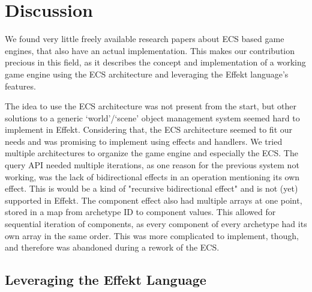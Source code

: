 \chapter{Discussion}\label{chap:discussion}

We found very little freely available research papers about ECS based game engines, that also have an actual implementation. This makes our contribution precious in this field, as it describes the concept and implementation of a working game engine using the ECS architecture and leveraging the Effekt language's features.

The idea to use the ECS architecture was not present from the start, but other solutions to a generic `world'/`scene' object management system seemed hard to implement in Effekt. Considering that, the ECS architecture seemed to fit our needs and was promising to implement using effects and handlers. We tried multiple architectures to organize the game engine and especially the ECS. The query API needed multiple iterations, as one reason for the previous system not working, was the lack of bidirectional effects in an operation mentioning its own effect. This is would be a kind of "recursive bidirectional effect" and is not (yet) supported in Effekt. The component effect also had multiple arrays at one point, stored in a map from archetype ID to component values. This allowed for sequential iteration of components, as every component of every archetype had its own array in the same order. This was more complicated to implement, though, and therefore was abandoned during a rework of the ECS.

\section{Leveraging the Effekt Language}

